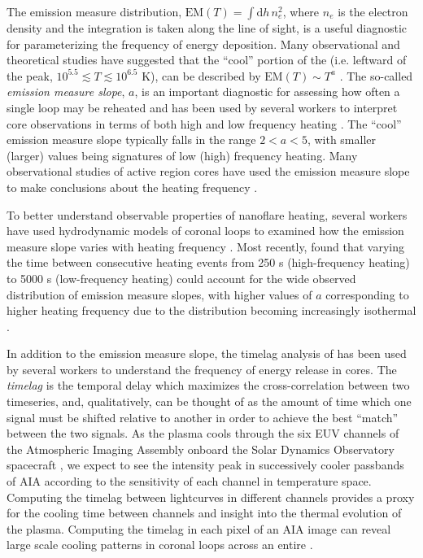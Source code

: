 The emission measure distribution, $\mathrm{EM}(T)=\int\mathrm{d}h\,n_e^2$, where $n_e$ is the electron density and the integration is taken along the line of sight, is a useful diagnostic for parameterizing the frequency of energy deposition. Many observational and theoretical studies have suggested that the ``cool'' portion of the \dem{} (i.e. leftward of the peak, $10^{5.5}\lesssim T\lesssim10^{6.5}$ K), can be described by $\mathrm{EM}(T)\sim T^a$ \citep{jordan_structure_1976,cargill_implications_1994,cargill_nanoflare_2004}. The so-called \textit{emission measure slope}, $a$, is an important diagnostic for assessing how often a single loop may be reheated and has been used by several workers to interpret \AR{} core observations in terms of both high and low frequency heating \citep[see Table 3 of][and references therin]{bradshaw_diagnosing_2012}. The ``cool'' emission measure slope typically falls in the range $2<a<5$, with smaller (larger) values being signatures of low (high) frequency heating. Many observational studies of active region cores have used the emission measure slope to make conclusions about the heating frequency \citep{tripathi_emission_2011,warren_constraints_2011,winebarger_using_2011,schmelz_cold_2012,warren_systematic_2012,del_zanna_evolution_2015}.

To better understand observable properties of nanoflare heating, several workers have used hydrodynamic models of coronal loops to examined how the emission measure slope varies with heating frequency \citep{mulu-moore_can_2011,bradshaw_diagnosing_2012,reep_diagnosing_2013}. Most recently, \citet{cargill_active_2014} found that varying the time between consecutive heating events from 250 s (high-frequency heating) to 5000 s (low-frequency heating) could account for the wide observed distribution of emission measure slopes, with higher values of $a$ corresponding to higher heating frequency due to the \dem{} distribution becoming increasingly isothermal \citep[see also][]{barnes_inference_2016-1}.

In addition to the emission measure slope, the timelag analysis of \citet{viall_evidence_2012} has been used by several workers to understand the frequency of energy release in \AR{} cores. The \textit{timelag} is the temporal delay which maximizes the cross-correlation between two timeseries, and, qualitatively, can be thought of as the amount of time which one signal must be shifted relative to another in order to achieve the best ``match'' between the two signals. As the plasma cools through the six EUV channels of the Atmospheric Imaging Assembly \citep[AIA,][]{lemen_atmospheric_2012} onboard the Solar Dynamics Observatory spacecraft \citep[SDO,][]{pesnell_solar_2012}, we expect to see the intensity peak in successively cooler passbands of AIA according to the sensitivity of each channel in temperature space. Computing the timelag between lightcurves in different channels provides a proxy for the cooling time between channels and insight into the thermal evolution of the plasma. Computing the timelag in each pixel of an AIA image can reveal large scale cooling patterns in coronal loops across an entire \AR{}.


